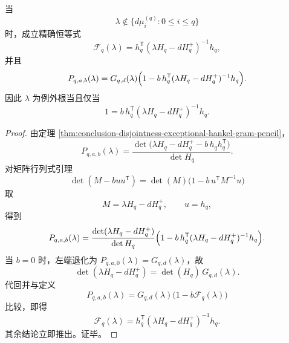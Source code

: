\begin{theorem}\label{thm:conclusion-disjointness-secant-hankel-resolvent-scalarization}
当
\[
\lambda\notin\{d\mu_i^{(q)}:0\le i\le q\}
\]
时，成立精确恒等式
\[
\mathcal F_q(\lambda)=h_q^{\mathsf T}(\lambda H_q-dH_q^{+})^{-1}h_q,
\]
并且
\[
P_{q,a,b}(\lambda)
=
G_{q,d}(\lambda)\Bigl(1-b\,h_q^{\mathsf T}(\lambda H_q-dH_q^{+})^{-1}h_q\Bigr).
\]
因此 \(\lambda\) 为例外根当且仅当
\[
1=b\,h_q^{\mathsf T}(\lambda H_q-dH_q^{+})^{-1}h_q.
\]
\end{theorem}
\begin{proof}
由定理 \ref{thm:conclusion-disjointness-exceptional-hankel-gram-pencil}，
\[
P_{q,a,b}(\lambda)
=
\frac{\det\!\bigl(\lambda H_q-dH_q^{+}-b\,h_qh_q^{\mathsf T}\bigr)}{\det H_q}.
\]
对矩阵行列式引理
\[
\det(M-buu^{\mathsf T})
=
\det(M)\bigl(1-b\,u^{\mathsf T}M^{-1}u\bigr)
\]
取
\[
M=\lambda H_q-dH_q^{+},
\qquad
u=h_q,
\]
得到
\[
P_{q,a,b}(\lambda)
=
\frac{\det(\lambda H_q-dH_q^{+})}{\det H_q}
\Bigl(1-b\,h_q^{\mathsf T}(\lambda H_q-dH_q^{+})^{-1}h_q\Bigr).
\]
当 \(b=0\) 时，左端退化为 \(P_{q,a,0}(\lambda)=G_{q,d}(\lambda)\)，故
\[
\det(\lambda H_q-dH_q^{+})=\det(H_q)\,G_{q,d}(\lambda).
\]
代回并与定义
\[
P_{q,a,b}(\lambda)=G_{q,d}(\lambda)\bigl(1-b\mathcal F_q(\lambda)\bigr)
\]
比较，即得
\[
\mathcal F_q(\lambda)=h_q^{\mathsf T}(\lambda H_q-dH_q^{+})^{-1}h_q.
\]
其余结论立即推出。证毕。
\end{proof}

